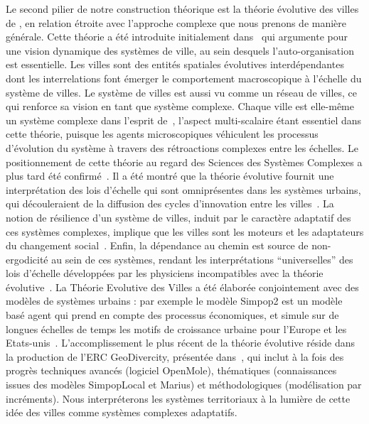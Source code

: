 {}{
Le second pilier de notre construction théorique est la théorie évolutive des villes de , en relation étroite avec l'approche complexe que nous prenons de manière générale. Cette théorie a été introduite initialement dans~\cite{pumain1997pour} qui argumente pour une vision dynamique des systèmes de ville, au sein desquels l'auto-organisation est essentielle. Les villes sont des entités spatiales évolutives interdépendantes dont les interrelations font émerger le comportement macroscopique à l'échelle du système de villes. Le système de villes est aussi vu comme un réseau de villes, ce qui renforce sa vision en tant que système complexe. Chaque ville est elle-même un système complexe dans l'esprit de~\cite{berry1964cities}, l'aspect multi-scalaire 
étant essentiel dans cette théorie, puisque les agents microscopiques véhiculent les processus d'évolution du système à travers des rétroactions complexes entre les échelles. Le positionnement de cette théorie au regard des Sciences des Systèmes Complexes a plus tard été confirmé~\cite{pumain2003approche}. Il a été montré que la théorie évolutive fournit une interprétation des lois d'échelle qui sont omniprésentes dans les systèmes urbains, qui découleraient de la diffusion des cycles d'innovation entre les villes~\cite{pumain2006evolutionary}. La notion de résilience d'un système de villes, induit par le caractère adaptatif des ces systèmes complexes, implique que les villes sont les moteurs et les adaptateurs du changement social~\cite{pumain2010theorie}. Enfin, la dépendance au chemin est source de non-ergodicité au sein de ces systèmes, rendant les interprétations ``universelles'' des lois d'échelle développées par les physiciens incompatibles avec la théorie évolutive~\cite{pumain2010theorie}.  La Théorie Evolutive des Villes a été élaborée conjointement avec des modèles de systèmes urbains : par exemple le modèle Simpop2 est un modèle basé agent qui prend en compte des processus économiques, et simule sur de longues échelles de temps les motifs de croissance urbaine pour l'Europe et les Etats-unis~\cite{doi:10.1177/0042098010377366}. L'accomplissement le plus récent de la théorie évolutive réside dans la production de l'ERC GeoDivercity, présentée dans~\cite{pumain2017urban}, qui inclut à la fois des progrès techniques avancés (logiciel OpenMole), thématiques (connaissances issues des modèles SimpopLocal et Marius) et méthodologiques (modélisation par incréments). Nous interpréterons les systèmes territoriaux à la lumière de cette idée des villes comme systèmes complexes adaptatifs.
}




